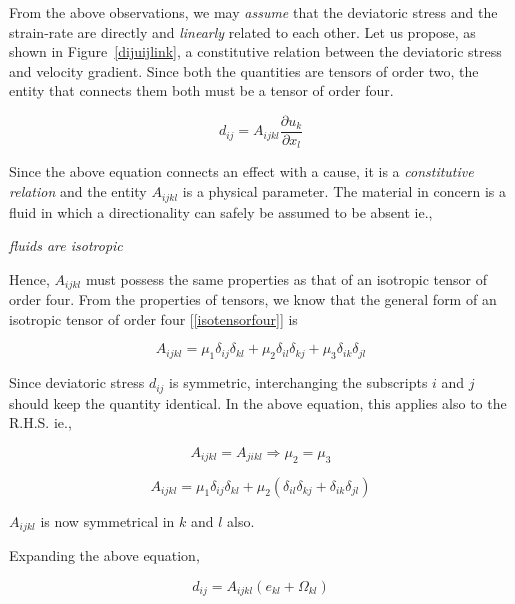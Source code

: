 From the above observations, we may {\em assume} that the deviatoric stress and the strain-rate are directly and {\em linearly} related to each other. Let us propose, as shown in Figure~\ref{dijuijlink}, a constitutive relation between the deviatoric stress and velocity gradient. Since both the quantities are tensors of order two, the entity that connects them both must be a tensor of order four.

\begin{equation}
d_{ij} = A_{ijkl} \frac{\partial u_k}{\partial x_l}
\end{equation} 

Since the above equation connects an effect with a cause, it is a {\em constitutive relation}
and the entity $A_{ijkl}$ is a physical parameter. The material in concern is a fluid in which a directionality can safely be assumed to be absent ie., 

\begin{center}
{\em fluids are isotropic}
\end{center}

 Hence, $A_{ijkl}$ must possess the same properties as that of an isotropic tensor of order four. From the properties of tensors, we know that the general form of an isotropic tensor of order four [\ref{isotensorfour}] is 

\begin{equation}
A_{ijkl} = \mu_1 \delta_{ij}\delta_{kl} + \mu_2 \delta_{il}\delta_{kj} + \mu_3 \delta_{ik}\delta_{jl}
\end{equation} 

Since deviatoric stress $d_{ij}$ is symmetric, interchanging the subscripts $i$ and $j$ should keep the quantity identical. In the above equation, this applies also to the R.H.S. ie.,

\begin{equation}
A_{ijkl} = A_{jikl} \Rightarrow \mu_2 = \mu_3
\end{equation} 

\begin{equation}
A_{ijkl} = \mu_1 \delta_{ij}\delta_{kl} + \mu_2 \left( \delta_{il}\delta_{kj} + \delta_{ik}\delta_{jl} \right)
\end{equation} 

$A_{ijkl}$ is now symmetrical in $k$ and $l$ also.

Expanding the above equation,

\begin{equation}
d_{ij} = A_{ijkl} \left( e_{kl} + \Omega_{kl} \right)
\end{equation} 


